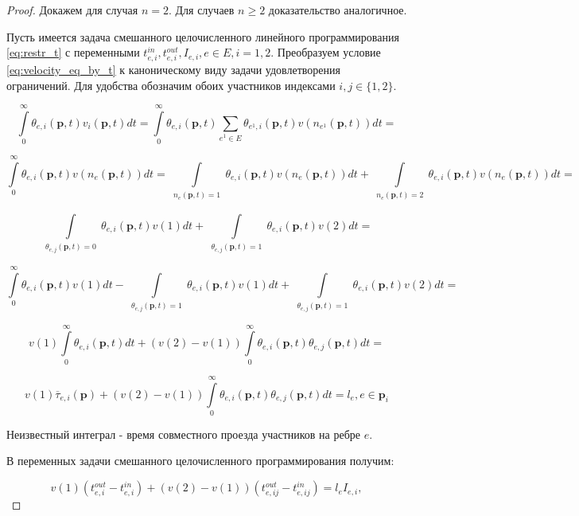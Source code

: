 \documentclass[12pt, a4paper]{article}
\begin{document}
\begin{proof}
	Докажем для случая $n = 2$. Для случаев $n \ge 2$ доказательство аналогичное.
	
	Пусть имеется задача смешанного целочисленного линейного программирования \eqref{eq:restr_t} с переменными $t_{e, i}^{in}, t_{e, i}^{out}, I_{e, i}, e \in E, i = 1, 2$. Преобразуем условие \eqref{eq:velocity_eq_by_t} к каноническому виду задачи удовлетворения ограничений. Для удобства обозначим обоих участников индексами $i, j \in \{1, 2\}$.
	
	$$\int\limits_{0}^{\infty} \theta_{e, i} (\textbf{p}, t) v_i(\textbf{p}, t)dt = \int\limits_{0}^{\infty} \theta_{e, i} (\textbf{p}, t) \sum \limits _{e^1 \in E} \theta_{e^1, i} (\textbf{p}, t) v (n_{e^1} (\textbf{p}, t)) dt = $$
	
	$$\int\limits_{0}^{\infty} \theta_{e, i} (\textbf{p}, t)  v (n_{e} (\textbf{p}, t)) dt = 
	  \int\limits_{ \substack{n_{e} (\textbf{p}, t) = 1}} \theta_{e, i} (\textbf{p}, t)  v (n_{e} (\textbf{p}, t)) dt +
	  \int\limits_{ \substack{n_{e} (\textbf{p}, t) = 2}} \theta_{e, i} (\textbf{p}, t)  v (n_{e} (\textbf{p}, t)) dt = $$
	
	$$\int\limits_{ \substack{\theta_{e, j} (\textbf{p}, t) = 0}} \theta_{e, i} (\textbf{p}, t)  v (1) dt +
	  \int\limits_{ \substack{\theta_{e, j} (\textbf{p}, t) = 1}} \theta_{e, i} (\textbf{p}, t)  v (2) dt = $$
	  
    $$\int\limits_{0}^{\infty} \theta_{e, i} (\textbf{p}, t)  v (1) dt - 
      \int\limits_{ \substack{\theta_{e, j} (\textbf{p}, t) = 1}} \theta_{e, i} (\textbf{p}, t)  v (1) dt +
	  \int\limits_{ \substack{\theta_{e, j} (\textbf{p}, t) = 1}} \theta_{e, i} (\textbf{p}, t)  v (2) dt = $$
	  
	$$v (1) \int\limits_{0}^{\infty} \theta_{e, i} (\textbf{p}, t) dt +
	  (v (2) - v(1)) \int\limits_{0}^{\infty} \theta_{e, i} (\textbf{p}, t) \theta_{e, j} (\textbf{p}, t) dt = $$
	  
    $$v (1) \overline{\tau}_{e, i} (\textbf{p}) +
    (v (2) - v(1)) \int\limits_{0}^{\infty} \theta_{e, i} (\textbf{p}, t) \theta_{e, j} (\textbf{p}, t) dt = l_e, e \in \textbf{p}_i$$
	  
	Неизвестный интеграл - время совместного проезда участников на ребре $e$.
	  
	В переменных задачи смешанного целочисленного программирования получим:
	
	$$v(1) (t_{e, i}^{out} - t_{e, i}^{in}) + (v(2) - v(1)) (t_{e, ij}^{out} - t_{e, ij}^{in}) = l_e I_{e, i},$$
	

\end{proof}
\end{document}
